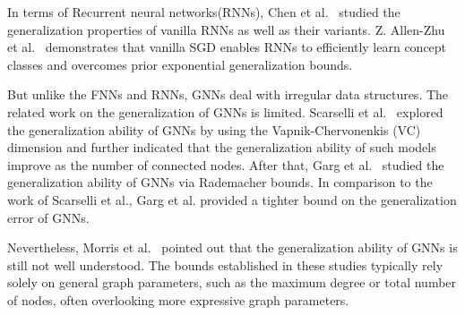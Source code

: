 In terms of Recurrent neural networks(RNNs), Chen et al.~\cite{chen2019generalization} studied the generalization properties of vanilla RNNs as well as their variants. Z. Allen-Zhu et al.~\cite{allen2019can} demonstrates that vanilla SGD enables RNNs to efficiently learn concept classes and overcomes prior exponential generalization bounds. 

But unlike the FNNs and RNNs, GNNs deal with irregular data structures. The related work on the generalization of GNNs is limited. Scarselli et al.~\cite{scarselli2018vapnik} explored the generalization ability of GNNs by using the Vapnik-Chervonenkis (VC) dimension and further indicated that the generalization ability of such models improve as the number of connected nodes. After that, Garg et al.~\cite{garg2020generalization} studied the generalization ability of GNNs via Rademacher bounds. In comparison to the work of Scarselli et al., Garg et al. provided a tighter bound on the generalization error of GNNs.

Nevertheless, Morris et al.~\cite{morris2024futuredirectionstheorygraph} pointed out that the generalization ability of GNNs is still not well understood. The bounds established in these studies typically rely solely on general graph parameters, such as the maximum degree or total number of nodes, often overlooking more expressive graph parameters.